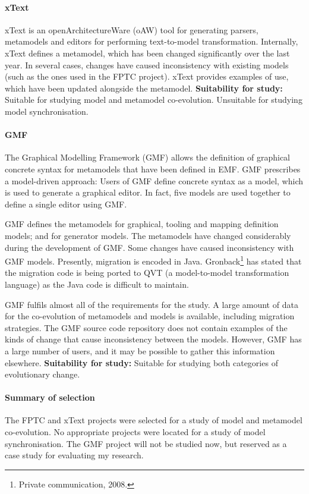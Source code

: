 \paragraph{xText} %
\label{par:xtext}
xText is an openArchitectureWare (oAW) \cite{oaw} tool for generating parsers, metamodels and editors for performing text-to-model transformation. Internally, xText defines a metamodel, which has been changed significantly over the last year. In several cases, changes have caused inconsistency with existing models (such as the ones used in the FPTC project). xText provides examples of use, which have been updated alongside the metamodel. \textbf{Suitability for study:} Suitable for studying model and metamodel co-evolution. Unsuitable for studying model synchronisation.

\paragraph{GMF} %
\label{par:gmf}
The Graphical Modelling Framework (GMF) \cite{gronback06gmf} allows the definition of graphical concrete syntax for metamodels that have been defined in EMF. GMF prescribes a model-driven approach: Users of GMF define concrete syntax as a model, which is used to generate a graphical editor. In fact, five models are used together to define a single editor using GMF.

GMF defines the metamodels for graphical, tooling and mapping definition models; and for generator models. The metamodels have changed considerably during the development of GMF. Some changes have caused inconsistency with GMF models. Presently, migration is encoded in Java. Gronback\footnote{Private communication, 2008.} has stated that the migration code is being ported to QVT (a model-to-model transformation language) as the Java code is difficult to maintain.

GMF fulfils almost all of the requirements for the study. A large amount of data for the co-evolution of metamodels and models is available, including migration strategies. The GMF source code repository does not contain examples of the kinds of change that cause inconsistency between the models. However, GMF has a large number of users, and it may be possible to gather this information elsewhere. \textbf{Suitability for study:} Suitable for studying both categories of evolutionary change.

\paragraph{Summary of selection}
The FPTC and xText projects were selected for a study of model and metamodel co-evolution. No appropriate projects were located for a study of model synchronisation. The GMF project will not be studied now, but reserved as a case study for evaluating my research.

